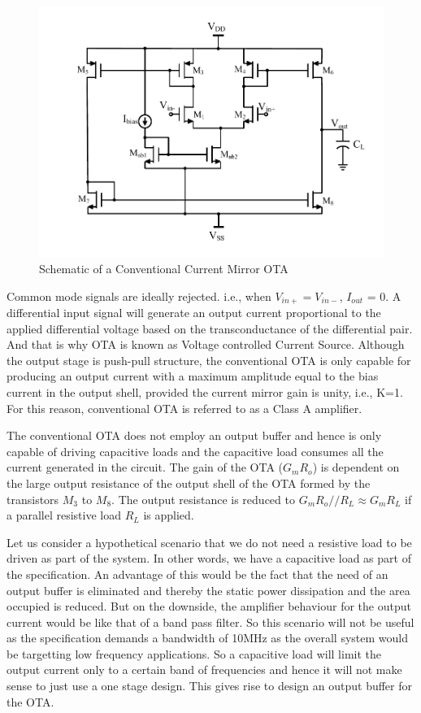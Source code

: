 \begin{figure} [H]
\centering
\includegraphics[scale=1]{Figures/Schematics/OTA_NMOS.pdf}
\caption{Schematic of a Conventional Current Mirror OTA}
\label{fig:OTA_Schematic_Ibias}
\end{figure}

Common mode signals are ideally rejected. i.e., when $V_{in+} = V_{in-}$, $I_{out}$ = 0. A differential input signal will generate an output current proportional to the applied differential voltage based on the transconductance of the differential pair. And that is why OTA is known as Voltage controlled Current Source. Although the output stage is push-pull structure, the conventional OTA is only capable for producing an output current with a maximum amplitude equal to the bias current in the output shell, provided the current mirror gain is unity, i.e., K=1. For this reason, conventional OTA is referred to as a Class A amplifier. 

The conventional OTA does not employ an output buffer and hence is only capable of driving capacitive loads and the capacitive load consumes all the current generated in the circuit. The gain of the OTA ($G_mR_o$) is dependent on the large output resistance of the output shell of the OTA formed by the transistors $M_3$ to $M_8$. The output resistance is reduced to $G_mR_o//R_L \approx G_mR_L$ if a parallel resistive load $R_L$ is applied.

Let us consider a hypothetical scenario that we do not need a resistive load to be driven as part of the system. In other words, we have a capacitive load as part of the specification. An advantage of this would be the fact that the need of an output buffer is eliminated and thereby the static power dissipation and the area occupied is reduced. But on the downside, the  amplifier behaviour for the output current would be like that of a band pass filter. So this scenario will not be useful as the specification demands a bandwidth of 10MHz as the overall system would be targetting low frequency applications. So a capacitive load will limit the output current only to a certain band of frequencies and hence it will not make sense to just use a one stage design. This gives rise to design an output buffer for the OTA.

